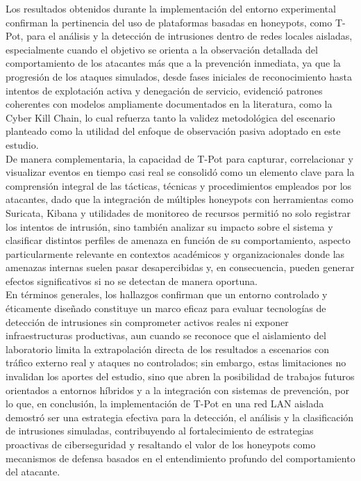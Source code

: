 Los resultados obtenidos durante la implementación del entorno experimental confirman la pertinencia del uso de plataformas basadas en honeypots, como T-Pot, para el análisis y la detección de intrusiones dentro de redes locales aisladas, especialmente cuando el objetivo se orienta a la observación detallada del comportamiento de los atacantes más que a la prevención inmediata, ya que la progresión de los ataques simulados, desde fases iniciales de reconocimiento hasta intentos de explotación activa y denegación de servicio, evidenció patrones coherentes con modelos ampliamente documentados en la literatura, como la Cyber Kill Chain, lo cual refuerza tanto la validez metodológica del escenario planteado como la utilidad del enfoque de observación pasiva adoptado en este estudio.\\
De manera complementaria, la capacidad de T-Pot para capturar, correlacionar y visualizar eventos en tiempo casi real se consolidó como un elemento clave para la comprensión integral de las tácticas, técnicas y procedimientos empleados por los atacantes, dado que la integración de múltiples honeypots con herramientas como Suricata, Kibana y utilidades de monitoreo de recursos permitió no solo registrar los intentos de intrusión, sino también analizar su impacto sobre el sistema y clasificar distintos perfiles de amenaza en función de su comportamiento, aspecto particularmente relevante en contextos académicos y organizacionales donde las amenazas internas suelen pasar desapercibidas y, en consecuencia, pueden generar efectos significativos si no se detectan de manera oportuna.\\
En términos generales, los hallazgos confirman que un entorno controlado y éticamente diseñado constituye un marco eficaz para evaluar tecnologías de detección de intrusiones sin comprometer activos reales ni exponer infraestructuras productivas, aun cuando se reconoce que el aislamiento del laboratorio limita la extrapolación directa de los resultados a escenarios con tráfico externo real y ataques no controlados; sin embargo, estas limitaciones no invalidan los aportes del estudio, sino que abren la posibilidad de trabajos futuros orientados a entornos híbridos y a la integración con sistemas de prevención, por lo que, en conclusión, la implementación de T-Pot en una red LAN aislada demostró ser una estrategia efectiva para la detección, el análisis y la clasificación de intrusiones simuladas, contribuyendo al fortalecimiento de estrategias proactivas de ciberseguridad y resaltando el valor de los honeypots como mecanismos de defensa basados en el entendimiento profundo del comportamiento del atacante.